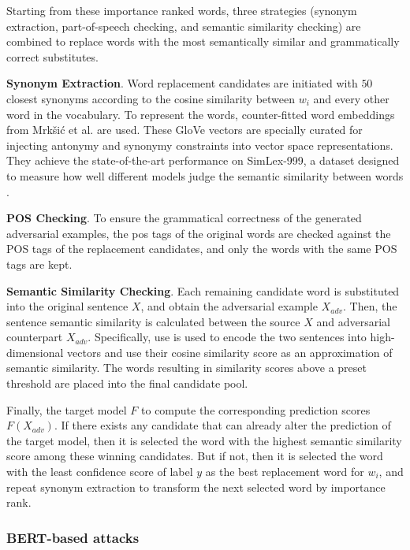 Starting from these importance ranked words, three strategies (synonym extraction, part-of-speech checking, and semantic similarity checking) are combined to replace words with the most semantically similar and grammatically correct substitutes.

\textbf{Synonym Extraction}.
Word replacement candidates are initiated with $50$ closest synonyms according to the cosine similarity between $w_i$ and every other word in the vocabulary.
To represent the words, counter-fitted word embeddings from Mrkšić et al. \cite{conf/naacl/MrksicSTGRSVWY16} are used.
These GloVe vectors are specially curated for injecting antonymy and synonymy constraints into vector space representations. They achieve the state-of-the-art performance on SimLex-999, a dataset designed to measure how well different models judge the semantic similarity between words \cite{hill2014simlex999}.


\textbf{POS Checking}.
To ensure the grammatical correctness of the generated adversarial examples, the \acrfull{pos} tags of the original words are checked against the POS tags of the replacement candidates, and only the words with the same POS tags are kept.

\textbf{Semantic Similarity Checking}.
Each remaining candidate word is substituted into the original sentence $X$, and obtain the adversarial example $X_{adv}$. Then, the sentence semantic similarity is calculated between the source $X$ and adversarial counterpart $X_{adv}$. Specifically, \acrfull{use} \cite{journals/corr/abs-1803-11175} is used to encode the two sentences into high-dimensional vectors and use their cosine similarity score as an approximation of semantic similarity. The words resulting in similarity scores above a preset threshold are placed into the final candidate pool.

Finally, the target model $F$ to compute the corresponding prediction scores $F(X_{adv})$.
If there exists any candidate that can already alter the prediction of the target model, then it is selected the word with the highest semantic similarity score among these winning candidates. 
But if not, then it is selected the word with the least confidence score of label $y$ as the best replacement word for $w_i$, and repeat synonym extraction to transform the next selected word by importance rank.

\subsubsection{BERT-based attacks}\label{subsubsec:bert-based-attacks}

